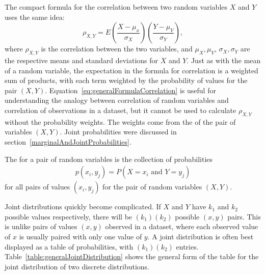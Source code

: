 The compact formula for the correlation between two random variables $X$ and $Y$  uses the same idea:
\begin{equation}
\rho_{X,Y} = E\left(\frac{X - \mu_x}{\sigma_X}\right)\left(\frac{Y - \mu_Y}{\sigma_Y} \right),
\label{eq:generalFormulaCorrelation}
\end{equation}
where $\rho_{X,Y}$ is the correlation between the two variables, and $\mu_X, \mu_Y$, $\sigma_X, \sigma_Y$ are the respective means and standard deviations for $X$ and $Y$. Just as with the mean of a random variable, the expectation in the formula for correlation is a weighted sum of products, with each term weighted by the probability of values for the pair $(X,Y)$.  Equation~\ref{eq:generalFormulaCorrelation} is useful for understanding the analogy between correlation of random variables and correlation of observations in a dataset, but it cannot be used to calculate $\rho_{X,Y}$ without the probability weights.  The weights come from the  of the pair of variables $(X,Y)$.  Joint probabilities were discussed in section~\ref{marginalAndJointProbabilities}.

\begin{termBox}{
		The  for a pair of random variables is the collection of probabilities
		\begin{align*}
		p(x_i,y_j) = P(X=x_i \text{ and } Y = y_j)
		\end{align*}
		for all pairs of values $(x_i,y_j)$ for the pair of random variables $(X,Y)$.}
\end{termBox}

Joint distributions quickly become complicated.  If $X$ and $Y$ have $k_1$ and $k_2$ possible values respectively, there will be $(k_1)(k_2)$ possible $(x,y)$ pairs. This is unlike pairs of values $(x,y)$ observed in a dataset, where each observed value of $x$ is usually paired with only one value of $y$. A joint distribution is often best displayed as a table of probabilities, with $(k_1)(k_2)$ entries.  Table~\ref{table:generalJointDistribution} shows the general form of the table for the joint distribution of two discrete distributions.

